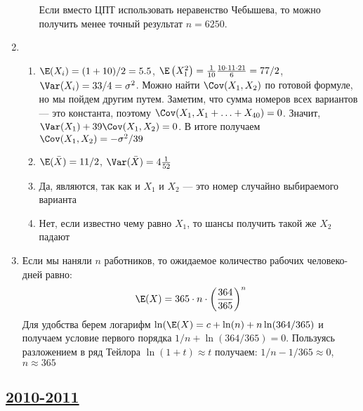 \begin{enumerate}
\begin{enumerate}
Если вместо ЦПТ использовать неравенство Чебышева, то можно получить менее точный
результат $n=6250$.
\end{enumerate}
\item
\begin{enumerate}
\item $\E(X_i) = (1 + 10) / 2 = 5.5$, $\E\left(X_1^2\right) = \frac{1}{10} \frac{10\cdot 11\cdot 21}{6}=77/2$,
$\Var(X_i) = 33/4 = \sigma^2$.
Можно найти $\Cov(X_1, X_2)$ по готовой формуле, но мы пойдем другим путем.
Заметим, что сумма номеров всех вариантов — это константа, поэтому
$\Cov(X_1, X_1 + \ldots + X_{40}) = 0$. Значит, $\Var(X_1) + 39\Cov(X_1, X_2) = 0$.
В итоге получаем $\Cov(X_1, X_2) = -\sigma^2 / 39$
\item $\E(\bar{X})=11/2$, $\Var(\bar{X})=4\frac{1}{52}$
\item Да, являются, так как и $X_1$ и $X_2$ — это номер случайно выбираемого варианта
\item Нет, если известно чему равно $X_1$, то шансы получить такой же $X_2$ падают
\end{enumerate}
\item
Если мы наняли $n$ работников, то ожидаемое количество рабочих человеко-дней равно:
\[
\E(X)=365\cdot n\cdot \left(\frac{364}{365}\right)^{n}
\]
Для удобства берем логарифм $\ln(\E(X)=c+\ln(n)+n\ln(364/365)$ и получаем условие
первого порядка $1/n+\ln(364/365)=0$. Пользуясь разложением в ряд Тейлора
$\ln(1+t)\approx t$ получаем: $1/n-1/365\approx 0$, $n\approx 365$
\end{enumerate}



\subsection[2010-2011]{\hyperref[sec:kr_02_2010_2011]{2010-2011}}
\label{sec:sol_kr_02_2010_2011}


